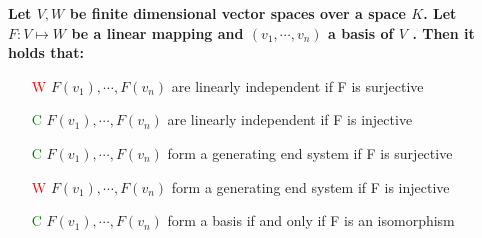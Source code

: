 \documentclass[7pt,landscape, margin = 0.1mm]{article}
\begin{document}
\begin{multicols}{4}
\begin{flushleft}
\textbf{ Let $V , W$ be finite dimensional vector spaces over a space $K$. Let $F : V \mapsto W$ be a linear mapping
and $(v_1, \cdots , v_n)$ a basis of $V$ . Then it holds that:}
\begin{itemize}
\item[\textcolor{red}{W}] $F(v_1) ,\cdots, F(v_n)$ are linearly independent if F is surjective
\item[\textcolor{green}{C}]  $F(v_1) ,\cdots, F(v_n)$ are linearly independent if F is injective
\item[\textcolor{green}{C}]  $F(v_1) ,\cdots, F(v_n)$ form a generating end system if F is surjective
\item[\textcolor{red}{W}]  $F(v_1) ,\cdots, F(v_n)$ form a generating end system if F is injective
\item[\textcolor{green}{C}]  $F(v_1) ,\cdots, F(v_n)$ form a basis if and only if F is an isomorphism
\end{itemize}
\hspace{3mm}


\end{flushleft}
\end{multicols}
\end{document}

